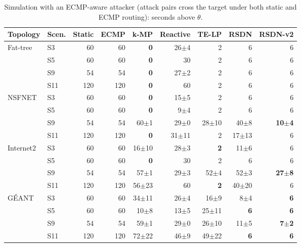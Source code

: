 \begin{table}[t]\centering\scriptsize
\caption{Simulation with an ECMP-aware attacker (attack pairs cross the target under both static and ECMP routing): seconds above $\theta$.}\label{tab:sim_ecmp}
\setlength{\tabcolsep}{3pt}
\begin{tabular}{llrrrrrrr}
\toprule
Topology & Scen. & Static & ECMP & k-MP & Reactive & TE-LP & RSDN & RSDN-v2\\
\midrule
Fat-tree & S3 & 60 & 60 & \textbf{0} & 26$\pm$4 & 2 & 6 & 6\\
 & S5 & 60 & 60 & \textbf{0} & 30 & 2 & 6 & 6\\
 & S9 & 54 & 54 & \textbf{0} & 27$\pm$2 & 2 & 6 & 6\\
 & S11 & 120 & 120 & \textbf{0} & 60 & 2 & 6 & 6\\
\midrule
NSFNET & S3 & 60 & 60 & \textbf{0} & 15$\pm$5 & 2 & 6 & 6\\
 & S5 & 60 & 60 & \textbf{0} & 9$\pm$4 & 2 & 6 & 6\\
 & S9 & 54 & 54 & 60$\pm$1 & 29$\pm$0 & 28$\pm$10 & 40$\pm$8 & \textbf{10$\pm$4}\\
 & S11 & 120 & 120 & \textbf{0} & 31$\pm$11 & 2 & 17$\pm$13 & 6\\
\midrule
Internet2 & S3 & 60 & 60 & 16$\pm$10 & 28$\pm$3 & \textbf{2} & 11$\pm$6 & 6\\
 & S5 & 60 & 60 & \textbf{0} & 30 & 2 & 6 & 6\\
 & S9 & 54 & 54 & 57$\pm$1 & 29$\pm$3 & 52$\pm$4 & 52$\pm$3 & \textbf{27$\pm$8}\\
 & S11 & 120 & 120 & 56$\pm$23 & 60 & \textbf{2} & 40$\pm$20 & 6\\
\midrule
G\'EANT & S3 & 60 & 60 & 34$\pm$11 & 26$\pm$4 & 16$\pm$9 & 8$\pm$4 & \textbf{6}\\
 & S5 & 60 & 60 & 10$\pm$8 & 13$\pm$5 & 25$\pm$11 & \textbf{6} & \textbf{6}\\
 & S9 & 54 & 54 & 59$\pm$1 & 29$\pm$0 & 26$\pm$10 & 11$\pm$5 & \textbf{7$\pm$2}\\
 & S11 & 120 & 120 & 72$\pm$22 & 46$\pm$9 & 49$\pm$22 & \textbf{6} & \textbf{6}\\
\bottomrule
\end{tabular}
\end{table}